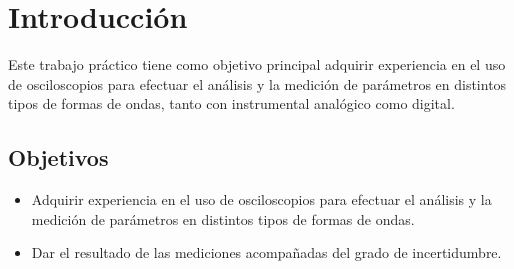 \chapter{Introducción}

Este trabajo práctico tiene como objetivo principal adquirir experiencia en el uso de osciloscopios para efectuar el
análisis y la medición de parámetros en distintos tipos de formas de ondas, tanto con instrumental analógico como
digital.

\section{Objetivos}
\begin{itemize}
    \item Adquirir experiencia en el uso de osciloscopios para efectuar el análisis y la medición de parámetros en
        distintos tipos de formas de ondas.
    \item Dar el resultado de las mediciones acompañadas del grado de incertidumbre.
\end{itemize}
